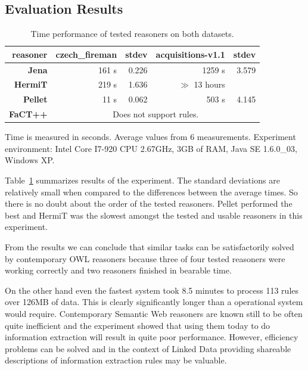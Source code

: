 \subsection{Evaluation Results}



\begin{table}
\begin{center}
\begin{tabular}{|r||r|r||r|r|}
\hline
reasoner & \textbf{czech\_fireman} & stdev & \textbf{acquisitions-v1.1} & stdev\\
\hline
\hline
\textbf{Jena} & 161 s & 0.226 & 1259 s & 3.579\\
\hline
\textbf{HermiT} & 219 s & 1.636 & $\gg$ 13 hours & \\
\hline
\textbf{Pellet} & 11 s & 0.062 & 503 s & 4.145\\
\hline
\textbf{FaCT++} & \multicolumn{4}{|c|}{Does not support rules.}\\
\hline
\end{tabular}
\end{center}

Time is measured in seconds. Average values from 6 measurements. Experiment environment: Intel Core I7-920 CPU 2.67GHz, 3GB of RAM, Java SE 1.6.0\_03, Windows XP.

\caption{Time performance of tested reasoners on both datasets.}
\label{tab:results}
\end{table}

Table~\ref{tab:results} summarizes results of the experiment. The standard deviations are relatively small when compared to the differences between the average times.  So there is no doubt about the order of the tested reasoners. Pellet performed the best and HermiT was the slowest amongst the tested and usable reasoners in this experiment.

From the results we can conclude that similar tasks can be satisfactorily solved by contemporary OWL reasoners because three of four tested reasoners were working correctly and two reasoners finished in bearable time.

On the other hand even the fastest system took 8.5 minutes to process 113 rules over 126MB of data. This is clearly   significantly longer than a operational system would require. 
Contemporary Semantic Web reasoners are known still to be often quite inefficient and the experiment showed that using them today to do information extraction will result in quite poor performance. However, efficiency problems can be solved
and in the context of Linked Data providing shareable descriptions of information extraction rules may be valuable.















